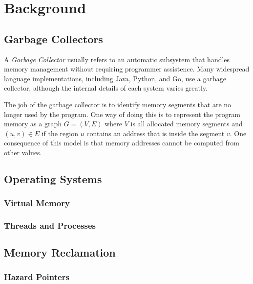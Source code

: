 \chapter{Background}

\section{Garbage Collectors}

A \emph{Garbage Collector} usually refers to an automatic subsystem that handles memory management
without requiring programmer assistence. Many widespread language implementations,
including Java, Python, and Go, use a garbage collector, although the internal details of each
system varies greatly.

The job of the garbage collector is to identify memory segments that are no longer used by the
program. One way of doing this is to represent the program memory as a graph $G=(V, E)$ where $V$ is
all allocated memory segments and $(u, v) \in E$ if the region $u$ contains an address that is
inside the segment $v$. One consequence of this model is that memory addresses cannot be computed
from other values.

\section{Operating Systems}

\todo{}

\subsection{Virtual Memory}

\todo{}

\subsection{Threads and Processes}

\todo{}

\section{Memory Reclamation}

\subsection{Hazard Pointers\label{sec:hazard-pointers}}
